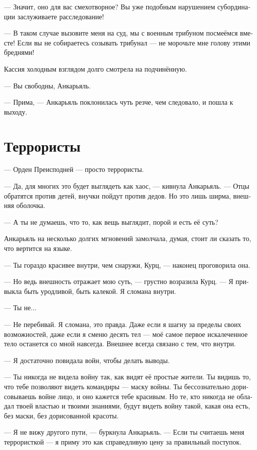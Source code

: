 \documentclass[a4paper,12pt,fleqn]{book}\usepackage{polyglossia}\setdefaultlanguage[babelshorthands=true]{russian}\setotherlanguage{english}\defaultfontfeatures{Ligatures=TeX,Mapping=tex-text}\usepackage{xcolor}\newcommand{\ml}[3]{#2}
\begin{document}
--- Значит, оно для вас смехотворное?
Вы уже подобным нарушением субординации заслуживаете расследование!

--- В таком случае вызовите меня на суд, мы с военным трибуном посмеёмся вместе!
Если вы не собираетесь созывать трибунал --- не морочьте мне голову этими бреднями!

Кассия холодным взглядом долго смотрела на подчинённую.

--- Вы свободны, Анкарьяль.

--- Прима, --- Анкарьяль поклонилась чуть резче, чем следовало, и пошла к выходу.

\section{Террористы}

--- Орден Преисподней --- просто террористы.

--- Да, для многих это будет выглядеть как хаос, --- кивнула Анкарьяль.
--- Отцы обратятся против детей, внучки пойдут против дедов.
Но это лишь ширма, внешняя оболочка.

--- А ты не думаешь, что то, как вещь выглядит, порой и есть её суть?

Анкарьяль на несколько долгих мгновений замолчала, думая, стоит ли сказать то, что вертится на языке.

--- Ты гораздо красивее внутри, чем снаружи, Курц, --- наконец проговорила она.

--- Но ведь внешность отражает мою суть, --- грустно возразила Курц.
--- Я привыкла быть уродливой, быть калекой.
Я сломана внутри.

--- Ты не...

--- Не перебивай.
Я сломана, это правда.
Даже если я шагну за пределы своих возможностей, даже если я сменю десять тел --- моё самое первое искалеченное тело останется со мной навсегда.
Внешнее всегда связано с тем, что внутри.

--- Я достаточно повидала войн, чтобы делать выводы.

--- Ты никогда не видела войну так, как видят её простые жители.
Ты видишь то, что тебе позволяют видеть командиры --- маску войны.
Ты бессознательно дорисовываешь войне лицо, и оно кажется тебе красивым.
Но те, кто никогда не обладал твоей властью и твоими знаниями, будут видеть войну такой, какая она есть, без маски, без дорисованной красоты.

--- Я не вижу другого пути, --- буркнула Анкарьяль.
--- Если ты считаешь меня террористкой --- я приму это как справедливую цену за правильный поступок.
\end{document}
